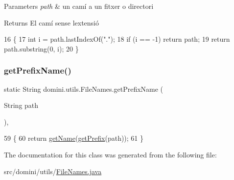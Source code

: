 \begin{DoxyParams}{Parameters}
{\em path} & un camí a un fitxer o directori \\
\hline
\end{DoxyParams}
\begin{DoxyReturn}{Returns}
El camí sense l\textquotesingle{}extensió 
\end{DoxyReturn}

\begin{DoxyCode}
16                                                 \{
17         \textcolor{keywordtype}{int} i = path.lastIndexOf(\textcolor{stringliteral}{"."});
18         \textcolor{keywordflow}{if} (i == -1) \textcolor{keywordflow}{return} path;
19         \textcolor{keywordflow}{return} path.substring(0, i);
20     \}
\end{DoxyCode}
\mbox{\label{classdomini_1_1utils_1_1FileNames_afcfe1e3bb1f49c70807fcd66a21d2b9a}} 
\subsubsection{\texorpdfstring{get\+Prefix\+Name()}{getPrefixName()}}
{\footnotesize\ttfamily static String domini.\+utils.\+File\+Names.\+get\+Prefix\+Name (\begin{DoxyParamCaption}\item[{String}]{path }\end{DoxyParamCaption})\hspace{0.3cm}{\ttfamily [inline]}, {\ttfamily [static]}}


\begin{DoxyCode}
59                                                     \{
60         \textcolor{keywordflow}{return} \hyperlink{classdomini_1_1utils_1_1FileNames_ade42cac265a0eb6d3bbccc671f669253}{getName}(\hyperlink{classdomini_1_1utils_1_1FileNames_a217ed1d50727e5109fdbd626a3b5bf07}{getPrefix}(path));
61     \}
\end{DoxyCode}


The documentation for this class was generated from the following file\+:\begin{DoxyCompactItemize}
\item 
src/domini/utils/\hyperlink{FileNames_8java}{File\+Names.\+java}\end{DoxyCompactItemize}
